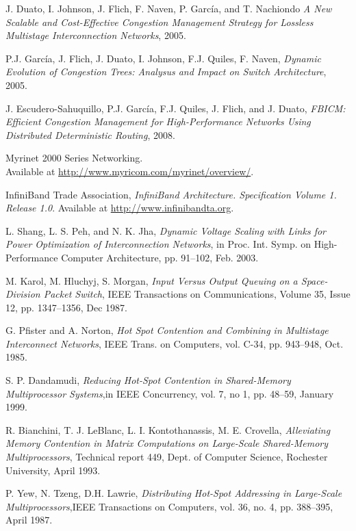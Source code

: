 \begin{thebibliography}{99}

 J. Duato, I. Johnson, J. Flich, F. Naven, P. Garc\'ia, and T. Nachiondo \emph{A New Scalable and Cost-Effective Congestion Management Strategy for Lossless Multistage Interconnection Networks}, 2005.

 P.J. Garc\'ia, J. Flich, J. Duato, I. Johnson, F.J. Quiles, F. Naven, \emph{Dynamic Evolution of Congestion Trees: Analysus and Impact on Switch Architecture}, 2005.

 J. Escudero-Sahuquillo, P.J. Garc\'ia, F.J.  Quiles, J. Flich, and J. Duato, \emph{FBICM: Efficient Congestion Management for High-Performance Networks Using Distributed Deterministic Routing}, 2008.

 Myrinet 2000 Series	 Networking.\\
Available at 
\url{http://www.myricom.com/myrinet/overview/}.

 InfiniBand Trade Association, \emph{InfiniBand Architecture. Specification Volume 1. Release 1.0}. Available at \url{http://www.infinibandta.org}.

 L. Shang, L. S. Peh, and N. K. Jha, \emph{Dynamic Voltage Scaling with Links for Power Optimization of Interconnection Networks}, in Proc. Int. Symp. on High-Performance Computer
Architecture, pp. 91--102, Feb. 2003.

 M. Karol, M. Hluchyj, S. Morgan, \emph{Input Versus Output Queuing on a Space-Division Packet Switch}, IEEE Transactions on Communications, Volume 35, Issue 12, pp. 1347--1356, Dec 1987.

 G. Pfister and A. Norton, \emph{Hot Spot Contention and Combining in Multistage Interconnect Networks}, IEEE Trans. on Computers, vol. C-34, pp. 943--948, Oct. 1985.

 S. P. Dandamudi, \emph{Reducing Hot-Spot Contention in Shared-Memory Multiprocessor Systems},in IEEE Concurrency, vol. 7, no 1, pp. 48--59, January 1999.

 R. Bianchini, T. J. LeBlanc, L. I. Kontothanassis, M. E. Crovella, \emph{Alleviating Memory Contention in Matrix Computations on Large-Scale Shared-Memory Multiprocessors}, Technical report 449, Dept. of Computer Science, Rochester University, April 1993.

 P. Yew, N. Tzeng, D.H. Lawrie, \emph{Distributing Hot-Spot Addressing in Large-Scale Multiprocessors},IEEE Transactions on Computers, vol. 36, no. 4, pp. 388--395, April 1987.


\end{thebibliography}
